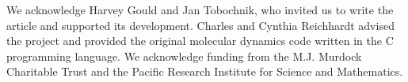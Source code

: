 \documentclass[twocolumn,preprintnumbers,amsmath,amssymb,aps,prx]{revtex4}
\begin{document}




\begin{acknowledgments}

  We acknowledge Harvey Gould and Jan Tobochnik,
  who invited us to write the article and
  supported its development.
  Charles and Cynthia Reichhardt advised 
  the project and provided the original molecular dynamics code
  written in the C programming language.
  We acknowledge funding from the M.J. Murdock Charitable Trust
  and the Pacific Research Institute for Science and Mathematics. %

\end{acknowledgments}
\end{document}

